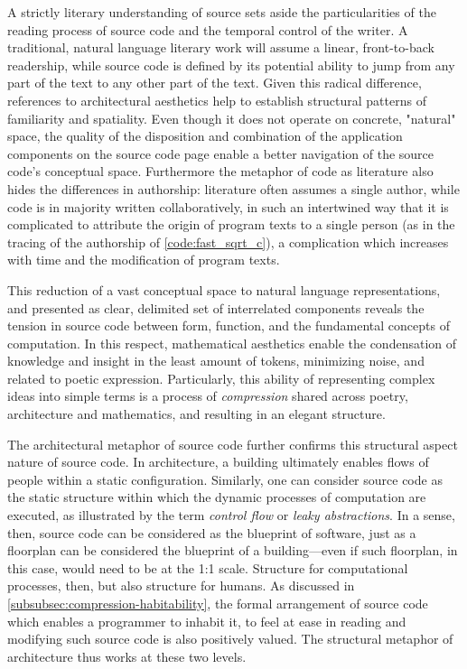 A strictly literary understanding of source sets aside the particularities of the reading process of source code and the temporal control of the writer. A traditional, natural language literary work will assume a linear, front-to-back readership, while source code is defined by its potential ability to jump from any part of the text to any other part of the text. Given this radical difference, references to architectural aesthetics help to establish structural patterns of familiarity and spatiality. Even though it does not operate on concrete, "natural" space, the quality of the disposition and combination of the application components on the source code page enable a better navigation of the source code's conceptual space. Furthermore the metaphor of code as literature also hides the differences in authorship: literature often assumes a single author, while code is in majority written collaboratively, in such an intertwined way that it is complicated to attribute the origin of program texts to a single person (as in the tracing of the authorship of \ref{code:fast_sqrt_c}), a complication which increases with time and the modification of program texts.

This reduction of a vast conceptual space to natural language representations, and presented as clear, delimited set of interrelated components reveals the tension in source code between form, function, and the fundamental concepts of computation. In this respect, mathematical aesthetics enable the condensation of knowledge and insight in the least amount of tokens, minimizing noise, and related to poetic expression. Particularly, this ability of representing complex ideas into simple terms is a process of \emph{compression} shared across poetry, architecture and mathematics, and resulting in an elegant structure.

The architectural metaphor of source code further confirms this structural aspect nature of source code. In architecture, a building ultimately enables flows of people within a static configuration. Similarly, one can consider source code as the static structure within which the dynamic processes of computation are executed, as illustrated by the term \emph{control flow} or \emph{leaky abstractions}. In a sense, then, source code can be considered as the blueprint of software, just as a floorplan can be considered the blueprint of a building—even if such floorplan, in this case, would need to be at the 1:1 scale. Structure for computational processes, then, but also structure for humans. As discussed in \ref{subsubsec:compression-habitability}, the formal arrangement of source code which enables a programmer to inhabit it, to feel at ease in reading and modifying such source code is also positively valued. The structural metaphor of architecture thus works at these two levels.

